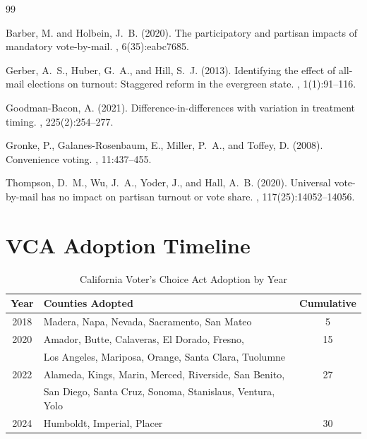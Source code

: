 \documentclass[12pt]{article}
\begin{document}

\begin{thebibliography}{99}

Barber, M. and Holbein, J.~B. (2020).
\newblock The participatory and partisan impacts of mandatory vote-by-mail.
, 6(35):eabc7685.

Gerber, A.~S., Huber, G.~A., and Hill, S.~J. (2013).
\newblock Identifying the effect of all-mail elections on turnout: Staggered reform in the evergreen state.
, 1(1):91--116.

Goodman-Bacon, A. (2021).
\newblock Difference-in-differences with variation in treatment timing.
, 225(2):254--277.

Gronke, P., Galanes-Rosenbaum, E., Miller, P.~A., and Toffey, D. (2008).
\newblock Convenience voting.
, 11:437--455.

Thompson, D.~M., Wu, J.~A., Yoder, J., and Hall, A.~B. (2020).
\newblock Universal vote-by-mail has no impact on partisan turnout or vote share.
, 117(25):14052--14056.

\end{thebibliography}

\newpage

\appendix

\section{VCA Adoption Timeline}

\begin{table}[H]
\centering
\caption{California Voter's Choice Act Adoption by Year}
\label{tab:vca_timeline}
\begin{tabular}{clc}
\toprule
Year & Counties Adopted & Cumulative \\
\midrule
2018 & Madera, Napa, Nevada, Sacramento, San Mateo & 5 \\
2020 & Amador, Butte, Calaveras, El Dorado, Fresno, & 15 \\
     & Los Angeles, Mariposa, Orange, Santa Clara, Tuolumne & \\
2022 & Alameda, Kings, Marin, Merced, Riverside, San Benito, & 27 \\
     & San Diego, Santa Cruz, Sonoma, Stanislaus, Ventura, Yolo & \\
2024 & Humboldt, Imperial, Placer & 30 \\
\bottomrule
\end{tabular}
\end{table}
\end{document}

